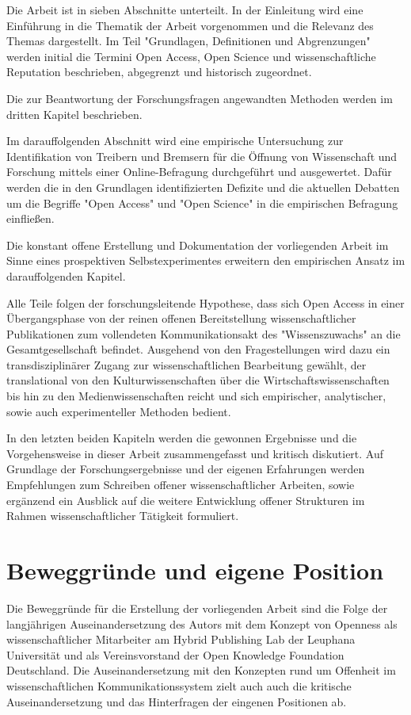 Die Arbeit ist in sieben Abschnitte unterteilt. In der Einleitung wird eine Einführung in die Thematik der Arbeit vorgenommen und die Relevanz des Themas dargestellt. Im Teil "Grundlagen, Definitionen und Abgrenzungen" werden initial die Termini Open Access, Open Science und wissenschaftliche Reputation beschrieben, abgegrenzt und historisch zugeordnet.

Die zur Beantwortung der Forschungsfragen angewandten Methoden werden im dritten Kapitel beschrieben.

Im darauffolgenden Abschnitt wird eine empirische Untersuchung zur Identifikation von Treibern und Bremsern für die Öffnung von Wissenschaft und Forschung mittels einer Online-Befragung durchgeführt und ausgewertet. Dafür werden die in den Grundlagen identifizierten Defizite und die aktuellen Debatten um die Begriffe "Open Access" und "Open Science" in die empirischen Befragung einfließen.

Die konstant offene Erstellung und Dokumentation der vorliegenden Arbeit im Sinne eines prospektiven Selbstexperimentes erweitern den empirischen Ansatz im darauffolgenden Kapitel.

Alle Teile folgen der forschungsleitende Hypothese, dass sich Open Access in einer Übergangsphase von der reinen offenen Bereitstellung wissenschaftlicher Publikationen zum vollendeten Kommunikationsakt des "Wissenszuwachs" \cite{Luhmann1998} an die Gesamtgesellschaft befindet. Ausgehend von den Fragestellungen wird dazu ein transdisziplinärer Zugang zur wissenschaftlichen Bearbeitung gewählt, der translational von den Kulturwissenschaften über die Wirtschaftswissenschaften bis hin zu den Medienwissenschaften reicht und sich empirischer, analytischer, sowie auch experimenteller Methoden bedient.

In den letzten beiden Kapiteln werden die gewonnen Ergebnisse und die Vorgehensweise in dieser Arbeit zusammengefasst und kritisch diskutiert. Auf Grundlage der Forschungsergebnisse und der eigenen Erfahrungen werden Empfehlungen zum Schreiben offener wissenschaftlicher Arbeiten, sowie ergänzend ein Ausblick auf die weitere Entwicklung offener Strukturen im Rahmen wissenschaftlicher Tätigkeit formuliert.

\section{Beweggründe und eigene Position}

Die Beweggründe für die Erstellung der vorliegenden Arbeit sind die Folge der langjährigen Auseinandersetzung des Autors mit dem Konzept von Openness als wissenschaftlicher Mitarbeiter am Hybrid Publishing Lab der Leuphana Universität und als Vereinsvorstand der Open Knowledge Foundation Deutschland. Die Auseinandersetzung mit den Konzepten rund um Offenheit im wissenschaftlichen Kommunikationssystem zielt auch auch die kritische Auseinandersetzung und das Hinterfragen der eingenen Positionen ab.

